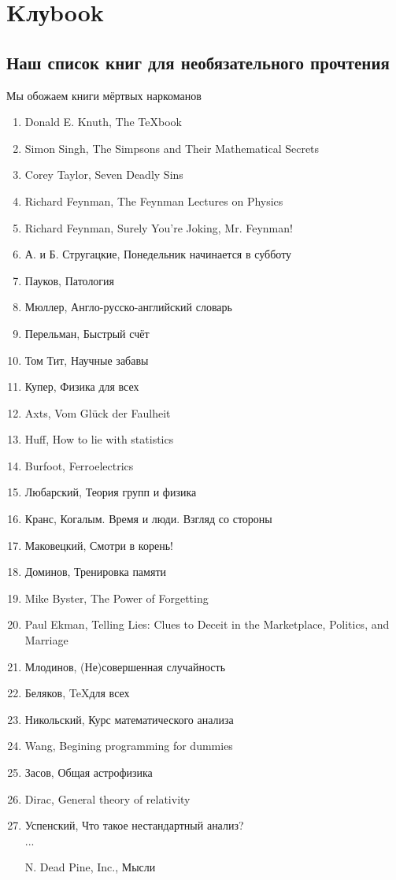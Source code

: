 \section*{Kлуbook} 
\subsection*{Наш список книг для необязательного прочтения} %
\begin{epigraph}
    Мы обожаем книги мёртвых наркоманов
\end{epigraph}

\vspace{-1em}\begin{enumerate}
    \item Donald E. Knuth, The {\TeX}book
    \item Simon Singh, The Simpsons and Their Mathematical Secrets
    \item Corey Taylor, Seven Deadly Sins 
    \item Richard Feynman, The Feynman Lectures on Physics
    \item Richard Feynman, Surely You're Joking, Mr. Feynman!
    \item А. и Б. Стругацкие, Понедельник начинается в субботу
    \item Пауков, Патология
    \item Мюллер, Англо-русско-английский словарь
    \item Перельман, Быстрый счёт
    \item Том Тит, Научные забавы
    \item Купер, Физика для всех
    \item Axts,  Vom Gl\"uck der Faulheit 
    \item Huff, How to lie with statistics
    \item Burfoot, Ferroelectrics
    \item Любарский, Теория групп и физика
    \item Кранс, Когалым. Время и люди. Взгляд со стороны
    \item Маковецкий, Смотри в корень!
    \item Доминов, Тренировка памяти
    \item Mike Byster, The Power of Forgetting
    \item Paul Ekman, Telling Lies: Clues to Deceit in the Marketplace, Politics, and Marriage
    \item Млодинов, (Не)совершенная случайность
    \item Беляков, \TeX для всех
    \item Никольский, Курс математического анализа
    \item Wang, Begining programming for dummies
    \item Засов, Общая астрофизика
    \item Dirac, General theory of relativity
    \item Успенский, Что такое нестандартный анализ?\\
    ...
    \item[N.] Dead Pine, Inc., Мысли
\end{enumerate}

